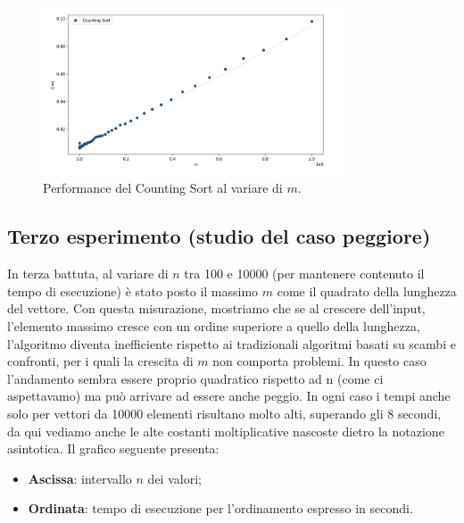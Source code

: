 \documentclass[a4paper, 12pt, oneside]{book}
\begin{document}
\begin{figure}[H]
    \centering
    \includegraphics[width=0.8\textwidth]{images/grafico_counting_sort_m.png}
    \caption{Performance del Counting Sort al variare di \(m\).}
    \label{fig:counting_sort_m}
\end{figure}

\subsection{Terzo esperimento (studio del caso peggiore)}
\noindent In terza battuta, al variare di \(n\) tra 100 e 10000 (per mantenere contenuto il tempo di esecuzione) è stato posto il massimo \(m\) come il quadrato della lunghezza del vettore. Con questa misurazione, mostriamo che se al crescere dell'input, l'elemento massimo cresce con un ordine superiore a quello della lunghezza, l'algoritmo diventa inefficiente rispetto ai tradizionali algoritmi basati su scambi e confronti, per i quali la crescita di \(m\) non comporta problemi. In questo caso l'andamento sembra essere proprio quadratico rispetto ad n (come ci aspettavamo) ma può arrivare ad essere anche peggio. In ogni caso i tempi anche solo per vettori da 10000 elementi risultano molto alti, superando gli 8 secondi, da qui vediamo anche le alte costanti moltiplicative nascoste dietro la notazione asintotica.
Il grafico seguente presenta:
\begin{itemize}
    \item \textbf{Ascissa}: intervallo \(n\) dei valori;
    \item \textbf{Ordinata}: tempo di esecuzione per l'ordinamento espresso in secondi.
\end{itemize}
\end{document}
